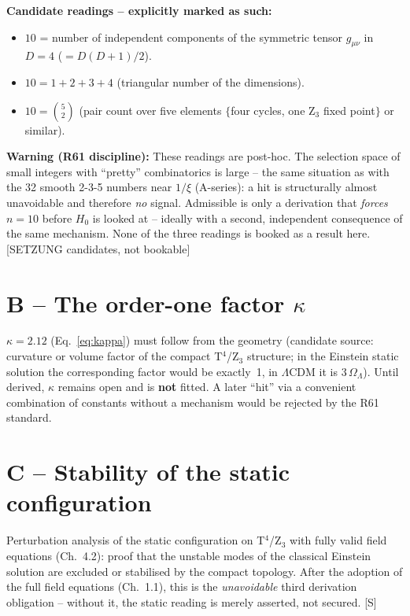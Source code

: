 \documentclass[11pt]{report}
\begin{document}
\textbf{Candidate readings -- explicitly marked as such:}
\begin{itemize}
  \item $10$ = number of independent components of the symmetric
        tensor $g_{\mu\nu}$ in $D=4$ ($= D(D{+}1)/2$).
  \item $10 = 1+2+3+4$ (triangular number of the dimensions).
  \item $10 = \binom{5}{2}$ (pair count over five elements
        $\{$four cycles, one Z$_3$ fixed point$\}$ or similar).
\end{itemize}

\textbf{Warning (R61 discipline):} These readings are post-hoc. The
selection space of small integers with \enquote{pretty}
combinatorics is large -- the same situation as with the 32 smooth
2-3-5 numbers near $1/\xi$ (A-series): a hit is structurally almost
unavoidable and therefore \emph{no} signal. Admissible is only a
derivation that \emph{forces} $n=10$ before $H_0$ is looked at --
ideally with a second, independent consequence of the same
mechanism. None of the three readings is booked as a result here.
[SETZUNG candidates, not bookable]

\section{B -- The order-one factor $\kappa$}

$\kappa = 2.12$ (Eq.~\eqref{eq:kappa}) must follow from the
geometry (candidate source: curvature or volume factor of the
compact T$^4$/Z$_3$ structure; in the Einstein static solution the
corresponding factor would be exactly~1, in $\Lambda$CDM it is
$3\,\Omega_\Lambda$). Until derived, $\kappa$ remains open and is
\textbf{not} fitted. A later \enquote{hit} via a convenient
combination of constants without a mechanism would be rejected by
the R61 standard.

\section{C -- Stability of the static configuration}

Perturbation analysis of the static configuration on T$^4$/Z$_3$
with fully valid field equations (Ch.~4.2): proof that the unstable
modes of the classical Einstein solution are excluded or stabilised
by the compact topology. After the adoption of the full field
equations (Ch.~1.1), this is the \emph{unavoidable} third
derivation obligation -- without it, the static reading is merely
asserted, not secured. [S]
\end{document}
